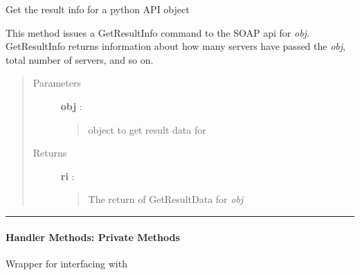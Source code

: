 \documentclass[letterpaper,10pt,english]{sphinxmanual}
\begin{document}
\begin{fulllineitems}
\label{pytan.handler:pytan.handler.Handler.get_result_info}
Get the result info for a python API object

This method issues a GetResultInfo command to the SOAP api for \emph{obj}. GetResultInfo returns information about how many servers have passed the \emph{obj}, total number of servers, and so on.
\begin{quote}\begin{description}
\item[{Parameters}] \leavevmode
\textbf{obj} : {\hyperref[taniumpy.object_types:taniumpy.object_types.base.BaseType]{}}
\begin{quote}

object to get result data for
\end{quote}

\item[{Returns}] \leavevmode
\textbf{ri} : {\hyperref[taniumpy.object_types:taniumpy.object_types.result_info.ResultInfo]{}}
\begin{quote}

The return of GetResultData for \emph{obj}
\end{quote}

\end{description}\end{quote}

\end{fulllineitems}



\bigskip\hrule{}\bigskip



\paragraph{Handler Methods: Private Methods}
\label{pytan.handler:handler-methods-private-methods}

\begin{fulllineitems}
\label{pytan.handler:pytan.handler.Handler._find}
Wrapper for interfacing with {\hyperref[taniumpy.session:taniumpy.session.Session.find]{}}

\end{fulllineitems}
\end{document}
